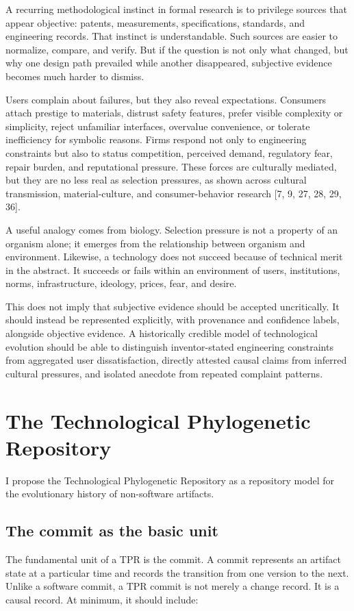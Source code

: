 \documentclass[11pt]{article}
\begin{document}
A recurring methodological instinct in formal research is to privilege sources that appear objective: patents, measurements, specifications, standards, and engineering records. That instinct is understandable. Such sources are easier to normalize, compare, and verify. But if the question is not only what changed, but why one design path prevailed while another disappeared, subjective evidence becomes much harder to dismiss.

Users complain about failures, but they also reveal expectations. Consumers attach prestige to materials, distrust safety features, prefer visible complexity or simplicity, reject unfamiliar interfaces, overvalue convenience, or tolerate inefficiency for symbolic reasons. Firms respond not only to engineering constraints but also to status competition, perceived demand, regulatory fear, repair burden, and reputational pressure. These forces are culturally mediated, but they are no less real as selection pressures, as shown across cultural transmission, material-culture, and consumer-behavior research [7, 9, 27, 28, 29, 36].

A useful analogy comes from biology. Selection pressure is not a property of an organism alone; it emerges from the relationship between organism and environment. Likewise, a technology does not succeed because of technical merit in the abstract. It succeeds or fails within an environment of users, institutions, norms, infrastructure, ideology, prices, fear, and desire.

This does not imply that subjective evidence should be accepted uncritically. It should instead be represented explicitly, with provenance and confidence labels, alongside objective evidence. A historically credible model of technological evolution should be able to distinguish inventor-stated engineering constraints from aggregated user dissatisfaction, directly attested causal claims from inferred cultural pressures, and isolated anecdote from repeated complaint patterns.

\section{The Technological Phylogenetic Repository}
I propose the Technological Phylogenetic Repository as a repository model for the evolutionary history of non-software artifacts.

\subsection{The commit as the basic unit}
The fundamental unit of a TPR is the commit. A commit represents an artifact state at a particular time and records the transition from one version to the next. Unlike a software commit, a TPR commit is not merely a change record. It is a causal record. At minimum, it should include:
\end{document}
